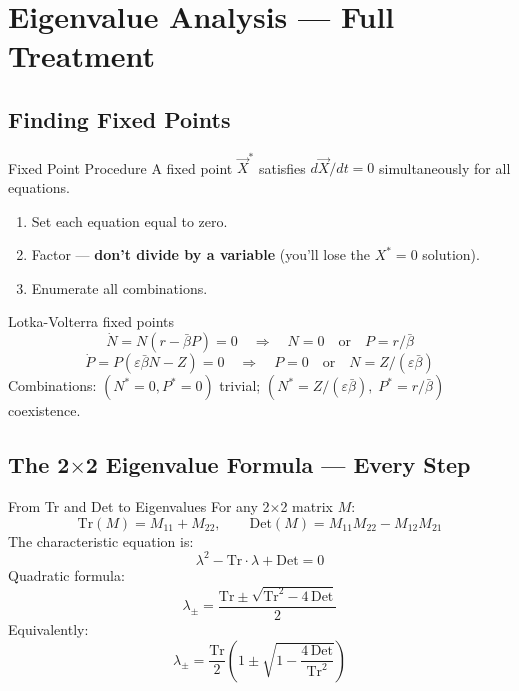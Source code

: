 \documentclass[10pt]{article}
\newcommand{\thus}{\quad\Longrightarrow\quad}
\begin{document}
\section{Eigenvalue Analysis --- Full Treatment}

\subsection{Finding Fixed Points}

\begin{rulebox}{Fixed Point Procedure}
A fixed point $\vec X^*$ satisfies $d\vec X/dt = 0$ simultaneously for all equations.
\begin{enumerate}
  \item Set each equation equal to zero.
  \item Factor --- \textbf{don't divide by a variable} (you'll lose the $X^* = 0$ solution).
  \item Enumerate all combinations.
\end{enumerate}
\end{rulebox}

\begin{exbox}{Lotka-Volterra fixed points}
\[
\dot N = N(r - \bar\beta P) = 0 \thus N = 0 \quad\text{or}\quad P = r/\bar\beta
\]
\[
\dot P = P(\varepsilon\bar\beta N - Z) = 0 \thus P = 0 \quad\text{or}\quad N = Z/(\varepsilon\bar\beta)
\]
Combinations: $(N^*=0, P^*=0)$ trivial; $(N^*=Z/(\varepsilon\bar\beta),\; P^*=r/\bar\beta)$ coexistence.
\end{exbox}

\subsection{The 2$\times$2 Eigenvalue Formula --- Every Step}

\begin{rulebox}{From Tr and Det to Eigenvalues}
For any 2$\times$2 matrix $M$:
\[
\text{Tr}(M) = M_{11} + M_{22}, \qquad \text{Det}(M) = M_{11}M_{22} - M_{12}M_{21}
\]
The characteristic equation is:
\[
\lambda^2 - \text{Tr}\cdot\lambda + \text{Det} = 0
\]
Quadratic formula:
\[
\lambda_\pm = \frac{\text{Tr} \pm \sqrt{\text{Tr}^2 - 4\,\text{Det}}}{2}
\]
Equivalently:
\[
\lambda_\pm = \frac{\text{Tr}}{2}\left(1 \pm \sqrt{1 - \frac{4\,\text{Det}}{\text{Tr}^2}}\right)
\]
\end{rulebox}
\end{document}
